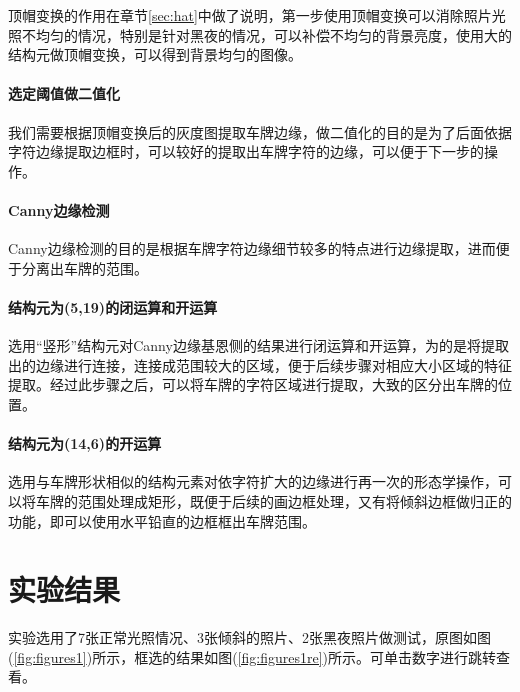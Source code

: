 \documentclass{hitreport}
\begin{document}
顶帽变换的作用在章节\ref{sec:hat}中做了说明，第一步使用顶帽变换可以消除照片光照不均匀的情况，特别是针对黑夜的情况，可以补偿不均匀的背景亮度，使用大的结构元做顶帽变换，可以得到背景均匀的图像。

\paragraph{选定阈值做二值化}

我们需要根据顶帽变换后的灰度图提取车牌边缘，做二值化的目的是为了后面依据字符边缘提取边框时，可以较好的提取出车牌字符的边缘，可以便于下一步的操作。

\paragraph{Canny边缘检测}

Canny边缘检测的目的是根据车牌字符边缘细节较多的特点进行边缘提取，进而便于分离出车牌的范围。

\paragraph{结构元为(5,19)的闭运算和开运算}

选用“竖形”结构元对Canny边缘基恩侧的结果进行闭运算和开运算，为的是将提取出的边缘进行连接，连接成范围较大的区域，便于后续步骤对相应大小区域的特征提取。经过此步骤之后，可以将车牌的字符区域进行提取，大致的区分出车牌的位置。

\paragraph{结构元为(14,6)的开运算}

选用与车牌形状相似的结构元素对依字符扩大的边缘进行再一次的形态学操作，可以将车牌的范围处理成矩形，既便于后续的画边框处理，又有将倾斜边框做归正的功能，即可以使用水平铅直的边框框出车牌范围。


\section{实验结果}

实验选用了7张正常光照情况、3张倾斜的照片、2张黑夜照片做测试，原图如图(\ref{fig:figures1})所示，框选的结果如图(\ref{fig:figures1re})所示。可单击数字进行跳转查看。
\end{document}
